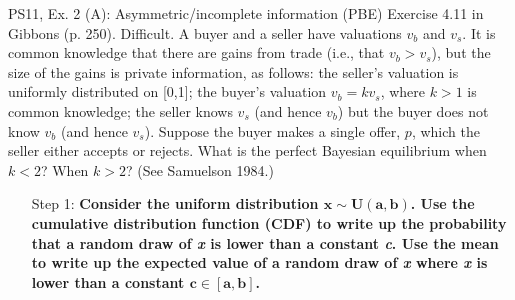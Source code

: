 \begin{frame}{PS11, Ex. 2 (A): Asymmetric/incomplete information (PBE)}
    Exercise 4.11 in Gibbons (p. 250). Difficult. A buyer and a seller have valuations $v_b$ and $v_s$. It is common knowledge that there are gains from trade (i.e., that $v_b > v_s$), but the size of the gains is private information, as follows: the seller’s valuation is uniformly distributed on [0,1]; the buyer’s valuation $v_b = kv_s$, where $k > 1$ is common knowledge; the seller knows $v_s$ (and hence $v_b$) but the buyer does not know $v_b$ (and hence $v_s$). Suppose the buyer makes a single offer, $p$, which the seller either accepts or rejects. What is the perfect Bayesian equilibrium when $k < 2$? When $k > 2$? (See Samuelson 1984.) \vspace{-8pt}
    \begin{multicols}{2}
      \begin{itemize}
        \item[Step 1:] \textbf{Consider the uniform distribution $\bm{x\sim U(a, b)}$. Use the cumulative distribution function (CDF) to write up the probability that a random draw of \textit{x} is lower than a constant \textit{c}. Use the mean to write up the expected value of a random draw of \textit{x} where \textit{x} is lower than a constant $\bm{c\in[a,b]}$.}
      \end{itemize}
      \vfill\null\columnbreak
      \vfill\null
    \end{multicols}
\end{frame}
